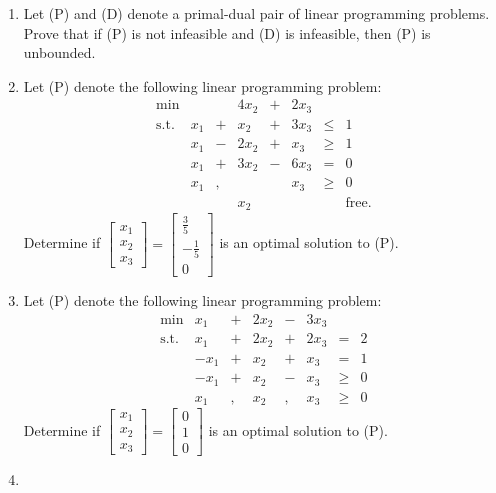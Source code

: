 \documentclass[]{book}
\theoremstyle{definition}
\theoremstyle{definition}
\theoremstyle{remark}
\begin{document}
\begin{enumerate}
\def\labelenumi{\arabic{enumi}.}
\item
  Let (P) and (D) denote a primal-dual pair of linear programming
  problems. Prove that if (P) is not infeasible and (D) is infeasible,
  then (P) is unbounded.
\item
  Let (P) denote the following linear programming problem:
  \[\begin{array}{rrcrcrll}
  \min & &  & 4x_2  & + & 2x_3  \\
  \text{s.t.} 
   & x_1 & + &  x_2 & + & 3x_3  & \leq & 1  \\
   & x_1 & - & 2x_2 & + &  x_3  & \geq & 1  \\
   & x_1 & + & 3x_2 & - & 6x_3  & = & 0  \\
   & x_1 & , &     &    & x_3  & \geq & 0 \\
   &     &   & x_2  &   &      &    & \text{free.}
  \end{array}\] Determine if
  \(\begin{bmatrix} x_1\\x_2\\x_3 \end{bmatrix} =\begin{bmatrix} \frac{3}{5} \\ -\frac{1}{5}\\ 0 \end{bmatrix}\)
  is an optimal solution to (P).
\item
  Let (P) denote the following linear programming problem:
  \[\begin{array}{rrcrcrlll}
  \min & x_1 & + & 2x_2  & - & 3x_3  \\
  \text{s.t.} 
  &  x_1 & + & 2 x_2 & + & 2x_3  & = & 2  \\
  &  -x_1 & + &  x_2 & + & x_3  & = & 1  \\
  &  -x_1 & + & x_2 & - & x_3  & \geq & 0  \\
  &  x_1 & , & x_2 & , & x_3  & \geq & 0 
  \end{array}\] Determine if
  \(\begin{bmatrix} x_1\\x_2\\x_3 \end{bmatrix} =\begin{bmatrix} 0 \\ 1\\ 0 \end{bmatrix}\)
  is an optimal solution to (P).
\item

\end{enumerate}
\end{document}
